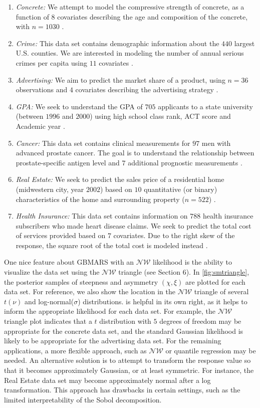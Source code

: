 \documentclass{article} %
\newcommand{\NIG}{\mathcal{NW}}
\begin{document}
\begin{enumerate}
    \item {\it Concrete:} We attempt to model the compressive strength of concrete, as a function of $8$ covariates describing the age and composition of the concrete, with $n=1030$ \citep{yeh1998modeling}.
    \item {\it Crime:} This data set contains demographic information about the $440$ largest U.S. counties. We are interested in modeling the number of annual serious crimes per capita using $11$ covariates \citep{kutner2005applied}. 
    \item {\it Advertising:} We aim to predict the market share of a product, using $n=36$ observations and $4$ covariates describing the advertising strategy \citep{kutner2005applied}. 
    \item {\it GPA:} We seek to understand the GPA of $705$ applicants to a state university (between $1996$ and $2000$) using high school class rank, ACT score and Academic year \citep{kutner2005applied}. 
    \item {\it Cancer:} This data set contains clinical measurements for $97$ men with advanced prostate cancer. The goal is to understand the relationship between prostate-specific antigen level and $7$ additional prognostic measurements \citep{kutner2005applied}. 
    \item {\it Real Estate:} We seek to predict the sales price of a residential home (midwestern city, year $2002$) based on $10$ quantitative (or binary) characteristics of the home and surrounding property ($n=522$) \citep{kutner2005applied}. 
    \item {\it Health Insurance:} This data set contains information on $788$ health insurance subscribers who made heart disease claims. We seek to predict the total cost of services provided based on $7$ covariates. Due to the right skew of the response, the square root of the total cost is modeled instead \citep{kutner2005applied}. 
\end{enumerate}

One nice feature about GBMARS with an $\NIG$ likelihood is the ability to visualize the data set using the $\NIG$ triangle (see Section 6). In \cref{fig:smtriangle}, the posterior samples of steepness and asymmetry $(\chi, \xi)$ are plotted for each data set. For reference, we also show the location in the $\NIG$ triangle of several $t(\nu)$ and log-normal($\sigma$) distributions.  is helpful in its own right, as it helps to inform the appropriate likelihood for each data set. For example, the $\NIG$ triangle plot indicates that a $t$ distribution with $5$ degrees of freedom may be appropriate for the concrete data set, and the standard Gaussian likelihood is likely to be appropriate for the advertising data set. For the remaining applications, a more flexible approach, such as $\NIG$ or quantile regression may be needed. An alternative solution is to attempt to transform the response value so that it becomes approximately Gaussian, or at least symmetric. For instance, the Real Estate data set may become approximately normal after a log transformation. This approach has drawbacks in certain settings, such as the limited interpretability of the Sobol decomposition. 
\end{document}
